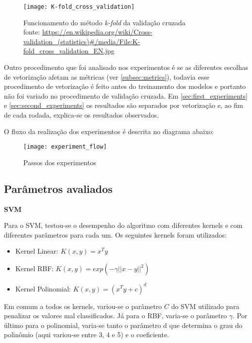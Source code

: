 \begin{figure}[H]
	\begin{center}
		\texttt{[image: K-fold\_cross\_validation]}
	\end{center}		
	\caption{Funcionamento do método \textit{k-fold} da validação cruzada \\
		fonte: \url{https://en.wikipedia.org/wiki/Cross-validation_(statistics)\#/media/File:K-fold_cross_validation_EN.jpg}}
	\label{fig:kfold}
\end{figure}

Outro procedimento que foi analisado nos experimentos é se as diferentes escolhas de vetorização afetam
as métricas (ver \ref{subsec:metrics}), todavia esse procedimento de vetorização é feito antes 
do treinamento dos modelos e portanto não foi variado no procedimento de validação cruzada. 
Em \ref{sec:first_experiments} e \ref{sec:second_experiments} 
os resultados são separados por vetorização e, ao fim de cada rodada, explica-se os resultados 
observados.

O fluxo da realização dos experimentos é descrita no diagrama abaixo:

\begin{figure}[H]
	\centering
	\texttt{[image: experiment\_flow]}
	\caption{Passos dos experimentos}
	\label{fig:diagram}
\end{figure}

\subsection{Parâmetros avaliados}
\label{subsec:parameters}

\textbf{SVM}

Para o SVM, testou-se o desempenho do algoritmo com diferentes kernels e com diferentes
parâmetros para cada um. Os seguintes kernels foram utilizados:

\begin{itemize}
	\item Kernel Linear: $K(x, y) = x^Ty$
	\item Kernel RBF: $K(x, y) = exp(-\gamma||x - y||^2)$
	\item Kernel Polinomial: $K(x, y) = (x^Ty + c)^d$
\end{itemize}

Em comum a todos os kernels, variou-se o parâmetro $C$ do SVM utilizado para penalizar os valores
mal classificados. Já para o RBF, varia-se o parâmetro $\gamma$. Por último para o polinomial,
varia-se tanto o parâmetro d que determina o grau do polinômio (aqui variou-se entre 3, 4 e 5) e o coeficiente.

